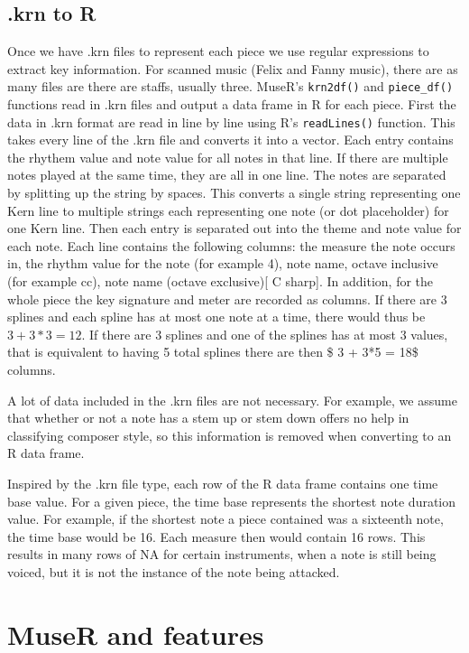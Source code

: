 \documentclass[12pt,twoside]{reedthesis}
\theoremstyle{definition}
\theoremstyle{definition}
\theoremstyle{definition}
\theoremstyle{remark}
\begin{document}
\section{.krn to R}\label{krn-to-r}

Once we have .krn files to represent each piece we use regular
expressions to extract key information. For scanned music (Felix and
Fanny music), there are as many files are there are staffs, usually
three. MuseR's \texttt{krn2df()} and \texttt{piece\_df()} functions read
in .krn files and output a data frame in R for each piece. First the
data in .krn format are read in line by line using R's
\texttt{readLines()} function. This takes every line of the .krn file
and converts it into a vector. Each entry contains the rhythem value and
note value for all notes in that line. If there are multiple notes
played at the same time, they are all in one line. The notes are
separated by splitting up the string by spaces. This converts a single
string representing one Kern line to multiple strings each representing
one note (or dot placeholder) for one Kern line. Then each entry is
separated out into the theme and note value for each note. Each line
contains the following columns: the measure the note occurs in, the
rhythm value for the note (for example 4), note name, octave inclusive
(for example cc), note name (octave exclusive){[} C sharp{]}. In
addition, for the whole piece the key signature and meter are recorded
as columns. If there are 3 splines and each spline has at most one note
at a time, there would thus be \(3 + 3*3=12\). If there are 3 splines
and one of the splines has at most 3 values, that is equivalent to
having 5 total splines there are then \$ 3 + 3*5 = 18\$ columns.

A lot of data included in the .krn files are not necessary. For example,
we assume that whether or not a note has a stem up or stem down offers
no help in classifying composer style, so this information is removed
when converting to an R data frame.

Inspired by the .krn file type, each row of the R data frame contains
one time base value. For a given piece, the time base represents the
shortest note duration value. For example, if the shortest note a piece
contained was a sixteenth note, the time base would be 16. Each measure
then would contain 16 rows. This results in many rows of NA for certain
instruments, when a note is still being voiced, but it is not the
instance of the note being attacked.

\chapter{MuseR and features}\label{muser-and-features}
\end{document}
